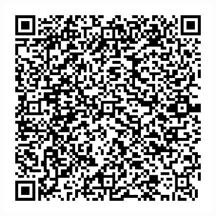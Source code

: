 \documentclass[12pt]{article}
\begin{document}
\begin{figure}[h]
    \centering
    \includegraphics[scale=0.3]{imagens/extra.jpg}
\end{figure}
\end{document}
